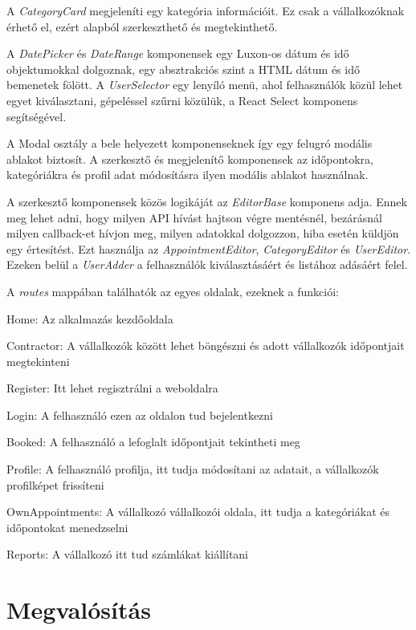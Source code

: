 A \textit{CategoryCard} megjeleníti egy kategória információit. Ez csak a vállalkozóknak érhető el, ezért alapból szerkeszthető és megtekinthető.

A \textit{DatePicker} és \textit{DateRange} komponensek egy Luxon-os dátum és idő objektumokkal dolgoznak, egy absztrakciós szint a HTML dátum és idő bemenetek fölött. A \textit{UserSelector} egy lenyíló menü, ahol felhasználók közül lehet egyet kiválasztani, gépeléssel szűrni közülük, a React Select komponens segítségével.

A Modal osztály a bele helyezett komponenseknek így egy felugró modális ablakot biztosít. A szerkesztő és megjelenítő komponensek az időpontokra, kategóriákra és profil adat módosításra ilyen modális ablakot használnak.

A szerkesztő komponensek közös logikáját az \textit{EditorBase} komponens adja. Ennek meg lehet adni, hogy milyen API hívást hajtson végre mentésnél, bezárásnál milyen callback-et hívjon meg, milyen adatokkal dolgozzon, hiba esetén küldjön egy értesítést. Ezt használja az \textit{AppointmentEditor}, \textit{CategoryEditor} és \textit{UserEditor}. Ezeken belül a \textit{UserAdder} a felhasználók kiválasztásáért és listához adásáért felel.

A \textit{routes} mappában találhatók az egyes oldalak, ezeknek a funkciói:

\begin{compactitem}
	\item Home: Az alkalmazás kezdőoldala
	\item Contractor: A vállalkozók között lehet böngészni és adott vállalkozók időpontjait megtekinteni
	\item Register: Itt lehet regisztrálni a weboldalra
	\item Login: A felhasználó ezen az oldalon tud bejelentkezni
	\item Booked: A felhasználó a lefoglalt időpontjait tekintheti meg
	\item Profile: A felhasználó profilja, itt tudja módosítani az adatait, a vállalkozók profilképet frissíteni
	\item OwnAppointments: A vállalkozó vállalkozói oldala, itt tudja a kategóriákat és időpontokat menedzselni
	\item Reports: A vállalkozó itt tud számlákat kiállítani
\end{compactitem}

\clearpage

\section{Megvalósítás}
